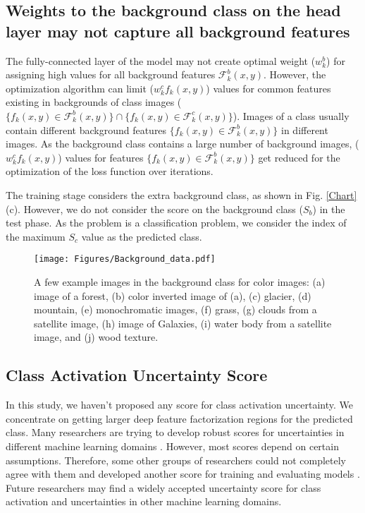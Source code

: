 \documentclass{article}
\begin{document}
\subsection{Weights to the background class on the head layer may not capture all background features}
The fully-connected layer of the model may not create optimal weight ($w_k^b$) for assigning high values for all background features $\mathcal{F}_k^b (x,y)$. However, the optimization algorithm can limit ($w_k^c f_k(x,y)$) values for common features existing in backgrounds of class images ($\{f_k (x,y) \in \mathcal{F}_k^b (x,y)\} \cap \{f_k (x,y) \in \mathcal{F}_k^c (x,y)\}$). Images of a class usually contain different background features $\{f_k (x,y) \in \mathcal{F}_k^b (x,y)\}$ in different images. As the background class contains a large number of background images, ($w_k^c f_k(x,y)$) values for features $\{f_k (x,y) \in \mathcal{F}_k^b (x,y)\}$ get reduced for the optimization of the loss function over iterations.

The training stage considers the extra background class, as shown in Fig. \ref{Chart}(c). However, we do not consider the score on the background class ($S_b$) in the test phase. As the problem is a classification problem, we consider the index of the maximum $S_c$ value as the predicted class. 

 
\begin{figure*}
\vskip 0.2in
\begin{center}
\centerline{\texttt{[image: Figures/Background\_data.pdf]}}
\caption{A few example images in the background class for color images: (a) image of a forest, (b) color inverted image of (a), (c) glacier, (d) mountain, (e) monochromatic images, (f) grass, (g) clouds from a satellite image, (h) image of Galaxies, (i) water body from a satellite image, and (j) wood texture. }
\label{Background}
\end{center}
\vskip -0.2in
\end{figure*}

\subsection{Class Activation Uncertainty Score}
In this study, we haven't proposed any score for class activation uncertainty. We concentrate on getting larger deep feature factorization regions for the predicted class. Many researchers are trying to develop robust scores for uncertainties in different machine learning domains \cite{marin2016prediction, kendall2018multi}. However, most scores depend on certain assumptions. Therefore, some other groups of researchers could not completely agree with them and developed another score for training and evaluating models \cite{pearce2018high, kabir2021optimal}. Future researchers may find a widely accepted uncertainty score for class activation and uncertainties in other machine learning domains.
\end{document}
